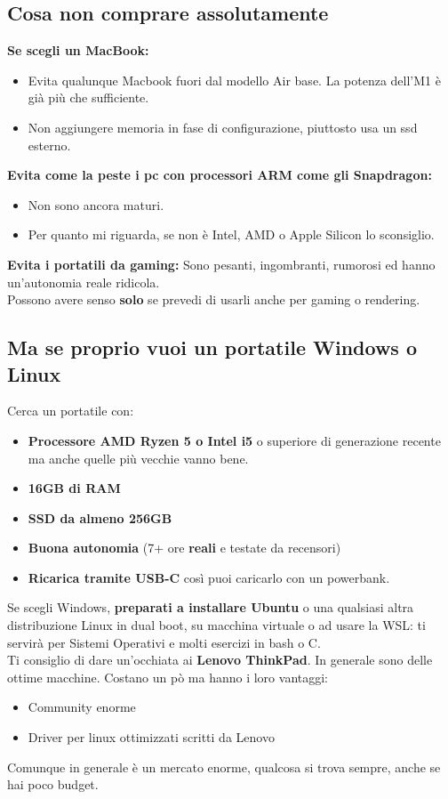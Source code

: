 \documentclass[18pt]{extarticle}
\begin{document}
\subsection{Cosa non comprare assolutamente}
\textbf{Se scegli un MacBook:}
\begin{itemize}
\item Evita qualunque Macbook fuori dal modello Air base. La potenza dell'M1 è già più che sufficiente.
\item Non aggiungere memoria in fase di configurazione, piuttosto usa un ssd esterno.
\end{itemize}%
\textbf{Evita come la peste i pc con processori ARM come gli Snapdragon:}
\begin{itemize}
\item Non sono ancora maturi.
\item Per quanto mi riguarda, se non è Intel, AMD o Apple Silicon lo sconsiglio.
\end{itemize}%
\textbf{Evita i portatili da gaming:}
Sono pesanti, ingombranti, rumorosi ed hanno un'autonomia reale ridicola.\\ 
Possono avere senso \textbf{solo} se prevedi di usarli anche per gaming o rendering.


\subsection{Ma se proprio vuoi un portatile Windows o Linux}
Cerca un portatile con:
\begin{itemize}
\item \textbf{Processore AMD Ryzen 5 o Intel i5} o superiore di generazione recente ma anche quelle più vecchie vanno bene.
\item \textbf{16GB di RAM}
\item \textbf{SSD da almeno 256GB}
\item \textbf{Buona autonomia} (7+ ore \textbf{reali} e testate da recensori)
\item \textbf{Ricarica tramite USB-C} così puoi caricarlo con un powerbank.
\end{itemize}%
Se scegli Windows, \textbf{preparati a installare Ubuntu} o una qualsiasi altra distribuzione Linux in dual boot, su macchina virtuale o ad usare la WSL: ti servirà per Sistemi Operativi e molti esercizi in bash o C.\\ Ti consiglio di dare un'occhiata ai \textbf{Lenovo ThinkPad}. In generale sono delle ottime macchine. Costano un pò ma hanno i loro vantaggi:
\begin{itemize}
\item Community enorme
\item Driver per linux ottimizzati scritti da Lenovo
\end{itemize}%
Comunque in generale è un mercato enorme, qualcosa si trova sempre, anche se hai poco budget.
\end{document}
